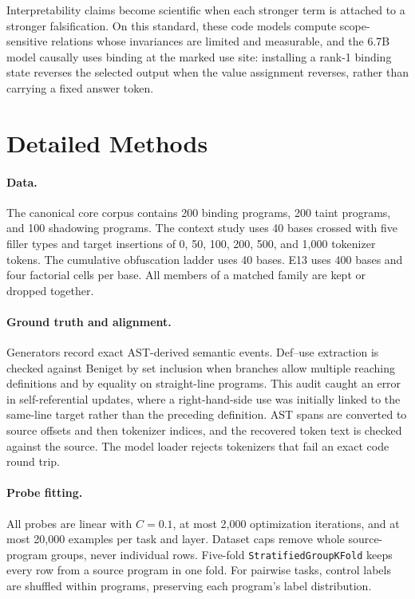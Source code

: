 \documentclass{article}
\begin{document}
Interpretability claims become scientific when each stronger term is attached to a stronger falsification. On this standard, these code models compute scope-sensitive relations whose invariances are limited and measurable, and the 6.7B model causally uses binding at the marked use site: installing a rank-1 binding state reverses the selected output when the value assignment reverses, rather than carrying a fixed answer token.

\clearpage
\appendix

\section{Detailed Methods}
\label{app:methods}

\paragraph{Data.}
The canonical core corpus contains 200 binding programs, 200 taint programs, and 100 shadowing programs. The context study uses 40 bases crossed with five filler types and target insertions of 0, 50, 100, 200, 500, and 1,000 tokenizer tokens. The cumulative obfuscation ladder uses 40 bases. E13 uses 400 bases and four factorial cells per base. All members of a matched family are kept or dropped together.

\paragraph{Ground truth and alignment.}
Generators record exact AST-derived semantic events. Def--use extraction is checked against Beniget by set inclusion when branches allow multiple reaching definitions and by equality on straight-line programs. This audit caught an error in self-referential updates, where a right-hand-side use was initially linked to the same-line target rather than the preceding definition. AST spans are converted to source offsets and then tokenizer indices, and the recovered token text is checked against the source. The model loader rejects tokenizers that fail an exact code round trip.

\paragraph{Probe fitting.}
All probes are linear with $C=0.1$, at most 2,000 optimization iterations, and at most 20,000 examples per task and layer. Dataset caps remove whole source-program groups, never individual rows. Five-fold \texttt{StratifiedGroupKFold} keeps every row from a source program in one fold. For pairwise tasks, control labels are shuffled within programs, preserving each program's label distribution.
\end{document}
